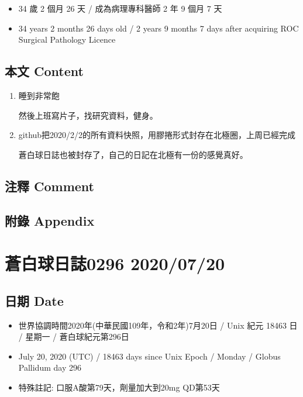 \documentclass[a5paper, 11pt
]{book}
\providecommand{\tightlist}{%
  \setlength{\itemsep}{0pt}\setlength{\parskip}{0pt}}
\begin{document}
\begin{itemize}
\tightlist
\item
  34 歲 2 個月 26 天 / 成為病理專科醫師 2 年 9 個月 7 天
\item
  34 years 2 months 26 days old / 2 years 9 months 7 days after
  acquiring ROC Surgical Pathology Licence
\end{itemize}

\hypertarget{ux672cux6587-content-43}{%
\subsection{本文 Content}\label{ux672cux6587-content-43}}

\begin{enumerate}
\def\labelenumi{\arabic{enumi}.}
\item
  睡到非常飽

  然後上班寫片子，找研究資料，健身。
\item
  github把2020/2/2的所有資料快照，用膠捲形式封存在北極圈，上周已經完成

  蒼白球日誌也被封存了，自己的日記在北極有一份的感覺真好。
\end{enumerate}

\hypertarget{ux6ce8ux91cb-comment-43}{%
\subsection{注釋 Comment}\label{ux6ce8ux91cb-comment-43}}

\hypertarget{ux9644ux9304-appendix-43}{%
\subsection{附錄 Appendix}\label{ux9644ux9304-appendix-43}}

\hypertarget{ux84bcux767dux7403ux65e5ux8a8c0296-20200720}{%
\section{蒼白球日誌0296
2020/07/20}\label{ux84bcux767dux7403ux65e5ux8a8c0296-20200720}}

\hypertarget{ux65e5ux671f-date-44}{%
\subsection{日期 Date}\label{ux65e5ux671f-date-44}}

\begin{itemize}
\tightlist
\item
  世界協調時間2020年(中華民國109年，令和2年)7月20日 / Unix 紀元 18463 日
  / 星期一 / 蒼白球紀元第296日
\item
  July 20, 2020 (UTC) / 18463 days since Unix Epoch / Monday / Globus
  Pallidum day 296
\item
  特殊註記: 口服A酸第79天，劑量加大到20mg QD第53天
\end{itemize}
\end{document}
